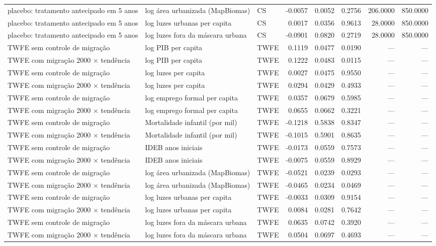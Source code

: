 \begin{table}
\begin{tabular}{lllrrrrr}
placebo: tratamento antecipado em 5 anos & log área urbanizada (MapBiomas) & CS & -0.0057 & 0.0052 & 0.2756 & 206.0000 & 850.0000 \\
placebo: tratamento antecipado em 5 anos & log luzes urbanas per capita & CS & 0.0017 & 0.0356 & 0.9613 & 28.0000 & 850.0000 \\
placebo: tratamento antecipado em 5 anos & log luzes fora da máscara urbana & CS & -0.0901 & 0.0820 & 0.2719 & 28.0000 & 850.0000 \\
TWFE sem controle de migração & log PIB per capita & TWFE & 0.1119 & 0.0477 & 0.0190 & — & — \\
TWFE com migração 2000 × tendência & log PIB per capita & TWFE & 0.1222 & 0.0483 & 0.0115 & — & — \\
TWFE sem controle de migração & log luzes per capita & TWFE & 0.0027 & 0.0475 & 0.9550 & — & — \\
TWFE com migração 2000 × tendência & log luzes per capita & TWFE & 0.0294 & 0.0429 & 0.4933 & — & — \\
TWFE sem controle de migração & log emprego formal per capita & TWFE & 0.0357 & 0.0679 & 0.5985 & — & — \\
TWFE com migração 2000 × tendência & log emprego formal per capita & TWFE & 0.0655 & 0.0662 & 0.3221 & — & — \\
TWFE sem controle de migração & Mortalidade infantil (por mil) & TWFE & -0.1218 & 0.5838 & 0.8347 & — & — \\
TWFE com migração 2000 × tendência & Mortalidade infantil (por mil) & TWFE & -0.1015 & 0.5901 & 0.8635 & — & — \\
TWFE sem controle de migração & IDEB anos iniciais & TWFE & -0.0173 & 0.0559 & 0.7573 & — & — \\
TWFE com migração 2000 × tendência & IDEB anos iniciais & TWFE & -0.0075 & 0.0559 & 0.8929 & — & — \\
TWFE sem controle de migração & log área urbanizada (MapBiomas) & TWFE & -0.0521 & 0.0239 & 0.0293 & — & — \\
TWFE com migração 2000 × tendência & log área urbanizada (MapBiomas) & TWFE & -0.0465 & 0.0234 & 0.0469 & — & — \\
TWFE sem controle de migração & log luzes urbanas per capita & TWFE & -0.0033 & 0.0309 & 0.9154 & — & — \\
TWFE com migração 2000 × tendência & log luzes urbanas per capita & TWFE & 0.0084 & 0.0281 & 0.7642 & — & — \\
TWFE sem controle de migração & log luzes fora da máscara urbana & TWFE & 0.0635 & 0.0742 & 0.3920 & — & — \\
TWFE com migração 2000 × tendência & log luzes fora da máscara urbana & TWFE & 0.0504 & 0.0697 & 0.4693 & — & — \\
\bottomrule
\end{tabular}
\end{table}

